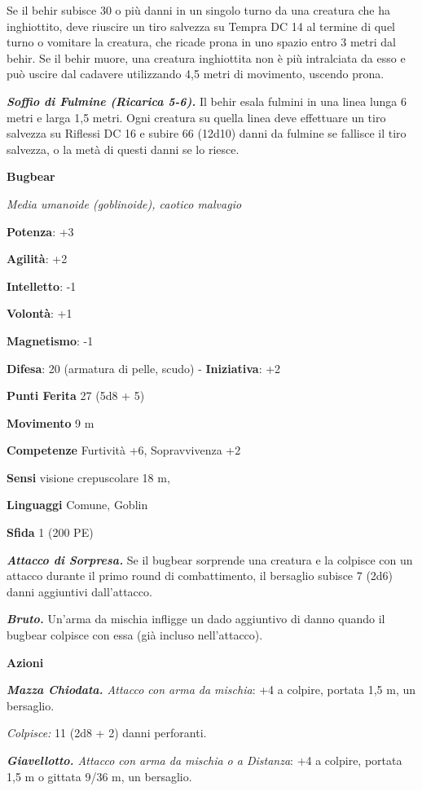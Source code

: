 \begin{multicols}{2}
Se il behir subisce 30 o più danni in un singolo turno da una creatura
che ha inghiottito, deve riuscire un tiro salvezza su Tempra DC 14
al termine di quel turno o vomitare la creatura, che ricade prona in uno
spazio entro 3 metri dal behir. Se il behir muore, una creatura
inghiottita non è più intralciata da esso e può uscire dal cadavere
utilizzando 4,5 metri di movimento, uscendo prona.

\emph{\textbf{Soffio di Fulmine (Ricarica 5-6).}} Il behir esala fulmini
in una linea lunga 6 metri e larga 1,5 metri. Ogni creatura su quella
linea deve effettuare un tiro salvezza su Riflessi DC 16 e subire 66
(12d10) danni da fulmine se fallisce il tiro salvezza, o la metà di
questi danni se lo riesce.

\textbf{Bugbear}

\emph{Media umanoide (goblinoide), caotico malvagio}

\textbf{Potenza}: +3

\textbf{Agilità}: +2

\textbf{Intelletto}: -1

\textbf{Volontà}: +1

\textbf{Magnetismo}: -1

\textbf{Difesa}: 20 (armatura di pelle, scudo) - \textbf{Iniziativa}: +2

\textbf{Punti Ferita} 27 (5d8 + 5)

\textbf{Movimento} 9 m

\textbf{Competenze} Furtività +6, Sopravvivenza +2

\textbf{Sensi} visione crepuscolare 18 m, 

\textbf{Linguaggi} Comune, Goblin

\textbf{Sfida} 1 (200 PE)

\emph{\textbf{Attacco di Sorpresa.}} Se il bugbear sorprende una
creatura e la colpisce con un attacco durante il primo round di
combattimento, il bersaglio subisce 7 (2d6) danni aggiuntivi
dall'attacco.

\emph{\textbf{Bruto.}} Un'arma da mischia infligge un dado aggiuntivo di
danno quando il bugbear colpisce con essa (già incluso nell'attacco).

\textbf{Azioni}

\emph{\textbf{Mazza Chiodata.} Attacco con arma da mischia}: +4 a
colpire, portata 1,5 m, un bersaglio.

\emph{Colpisce:} 11 (2d8 + 2) danni perforanti.

\emph{\textbf{Giavellotto.} Attacco con arma da mischia o a Distanza}:
+4 a colpire, portata 1,5 m o gittata 9/36 m, un bersaglio.


\end{multicols}
